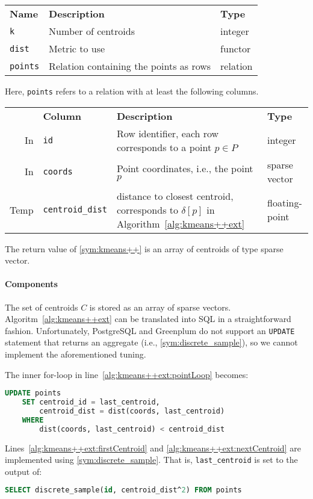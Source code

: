 \begin{center}
	\begin{tabular}{lll}
		\toprule%
		\textbf{Name} & \textbf{Description} & \textbf{Type}
		\\\otoprule
		\texttt{k} &
		Number of centroids &
		integer
		\\\midrule
		\texttt{dist} &
		Metric to use &
		functor
		\\\midrule
		\texttt{points} &
		Relation containing the points as rows &
		relation
		\\\bottomrule
	\end{tabular}
\end{center}
%
Here, \texttt{points} refers to a relation with at least the following columns.
%
\begin{center}
	\begin{tabularx}{\linewidth}{rlXl}
		\toprule%
		& \textbf{Column} & \textbf{Description} & \textbf{Type}
		\\\otoprule
		In &
		\texttt{id} &
		Row identifier, each row corresponds to a point $p \in P$ &
		integer
		\\\midrule
		In &
		\texttt{coords} &
		Point coordinates, i.e., the point $p$ &
		sparse vector
		\\\midrule
		Temp &
		\texttt{centroid\_dist} &
		distance to closest centroid, corresponds to $\delta[p]$ in Algorithm~\ref{alg:kmeans++ext} &
		floating-point
		\\\bottomrule
	\end{tabularx}
\end{center}
%
The return value of \ref{sym:kmeans++} is an array of centroids of type sparse vector.

\paragraph{Components} The set of centroids $C$ is stored as an array of sparse vectors. Algoritm~\ref{alg:kmeans++ext} can be translated into SQL in a straightforward fashion. Unfortunately, PostgreSQL and Greenplum do not support an \texttt{UPDATE} statement that returns an aggregate (i.e., \ref{sym:discrete_sample}), so we cannot implement the aforementioned tuning.

The inner for-loop in line~\ref{alg:kmeans++ext:pointLoop} becomes:
\begin{lstlisting}[language=SQL]
	UPDATE points
	SET centroid_id = last_centroid,
	    centroid_dist = dist(coords, last_centroid)
	WHERE
	    dist(coords, last_centroid) < centroid_dist
\end{lstlisting}
Lines~\ref{alg:kmeans++ext:firstCentroid} and \ref{alg:kmeans++ext:nextCentroid} are implemented using \ref{sym:discrete_sample}. That is, \texttt{last\_centroid} is set to the output of:
\begin{lstlisting}[language=SQL]
	SELECT discrete_sample(id, centroid_dist^2) FROM points
\end{lstlisting}

